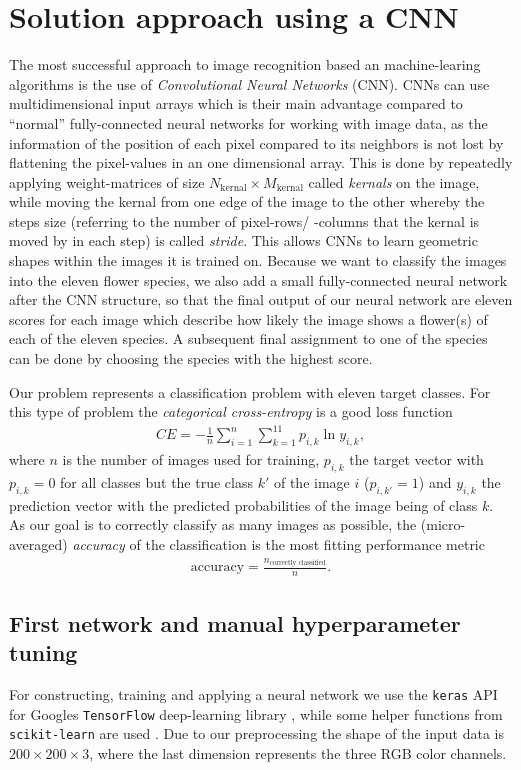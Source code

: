 \section{Solution approach using a CNN}
\label{sec:ansatz}
The most successful approach to image recognition based an machine-learing algorithms is the use of \textit{Convolutional Neural Networks} (CNN).
CNNs can use multidimensional input arrays which is their main advantage compared to \enquote{normal} fully-connected neural networks for working with image data, 
as the information of the position of each pixel compared to its neighbors is not lost by flattening the pixel-values in an one dimensional array.
This is done by repeatedly applying weight-matrices of size $N_\text{kernal}\times M_\text{kernal}$ called \textit{kernals} on the image, while moving the kernal from one edge of the image to the other 
whereby the steps size (referring to the number of pixel-rows/ -columns that the kernal is moved by in each step) is called \textit{stride}.
This allows CNNs to learn geometric shapes within the images it is trained on.
Because we want to classify the images into the eleven flower species, we also add a small fully-connected neural network after the CNN structure, so that the final output of our
neural network are eleven scores for each image which describe how likely the image shows a flower(s) of each of the eleven species.
A subsequent final assignment to one of the species can be done by choosing the species with the highest score.

Our problem represents a classification problem with eleven target classes.
For this type of problem the \textit{categorical cross-entropy} is a good loss function
\begin{align}
    CE = -\frac{1}{n} \sum_{i=1}^n \sum_{k=1}^{11} p_{i,k} \ln{y_{i,k}},
\end{align}
where $n$ is the number of images used for training, $p_{i,k}$ the target vector with $p_{i,k} = 0$ for all classes but the true class $k'$ of the image $i$ ($p_{i,k'} = 1$) and 
$y_{i,k}$ the prediction vector with the predicted probabilities of the image being of class $k$.
As our goal is to correctly classify as many images as possible, the (micro-averaged) \textit{accuracy} of the classification is the most fitting performance metric
\begin{align}
    \text{accuracy} = \frac{n_\text{correctly classified}}{n}.
\end{align}


\subsection{First network and manual hyperparameter tuning}
For constructing, training and applying a neural network we use the \texttt{keras} API for Googles \texttt{TensorFlow} deep-learning library \cite{keras}, 
while some helper functions from \texttt{scikit-learn} are used \cite{scikit-learn}.
Due to our preprocessing the shape of the input data is $200\times 200\times 3$, where the last dimension represents the three RGB color channels.

